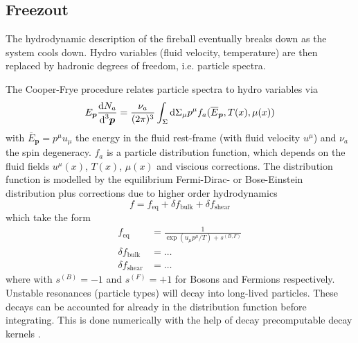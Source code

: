 \subsection{Freezout \cite{DevetakEtAl_2020}}

The hydrodynamic description of the fireball eventually breaks down as the system cools down. Hydro variables (fluid velocity, temperature) are then replaced by hadronic degrees of freedom, i.e. particle spectra.

The Cooper-Frye procedure relates particle spectra to hydro variables via
\begin{equation}
    E_{{\boldsymbol{p}}}\frac{\text{d} N_a}{\text{d}^3{\boldsymbol{p}}}=\frac{\nu_a}{(2\pi)^3}\int_\Sigma\text{d}\Sigma_\mu p^\mu f_a(\overline{E}_{\boldsymbol{p}},T(x),\mu(x))
\end{equation}
with $\overline{E}_\mathbf{p}=p^\mu u_\mu$ the energy in the fluid rest-frame (with fluid velocity $u^\mu$) and $\nu_a$ the spin degeneracy. $f_a$ is a particle distribution function, which depends on the fluid fields $u^\mu(x)$, $T(x)$, $\mu(x)$ and viscious corrections. The distribution function is modelled by the equilibrium Fermi-Dirac- or Bose-Einstein distribution plus corrections due to higher order hydrodynamics
\begin{equation}
    f=f_{\text{eq}}+\delta f_{\text{bulk}}+\delta f_{\text{shear}}
\end{equation}
which take the form
\begin{subequations}
    \begin{align}
        f_{\text{eq}}           & =\frac{1}{\exp(u_\mu p^\mu/T)+s^{(B,F)}} \\
        \delta f_{\text{bulk}}  & =\dots                                   \\
        \delta f_{\text{shear}} & =\dots
    \end{align}
\end{subequations}
where with $s^{(B)}=-1$ and $s^{(F)}=+1$ for Bosons and Fermions respectively. Unstable resonances (particle types) will decay into long-lived particles. These decays can be accounted for already in the distribution function before integrating. This is done numerically with the help of decay precomputable decay kernels \cite{MazeliauskasEtAl_2019}.


